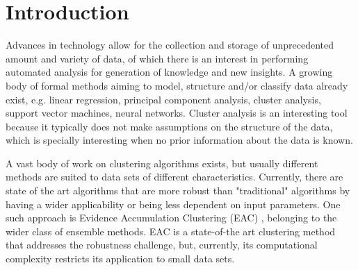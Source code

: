 
\section{Introduction}
\label{sec:intro}



Advances in technology allow for the collection and storage of unprecedented amount and variety of data, of which there is an interest in performing automated analysis for generation of knowledge and new insights.
A growing body of formal methods aiming to model, structure and/or classify data already exist, e.g. linear regression, principal component analysis, cluster analysis, support vector machines, neural networks.
Cluster analysis is an interesting tool because it typically does not make assumptions on the structure of the data, which is specially interesting when no prior information about the data is known.

A vast body of work on clustering algorithms exists, but usually different methods are suited to data sets of different characteristics.
Currently, there are state of the art algorithms that are more robust than "traditional" algorithms by having a wider applicability or being less dependent on input parameters.
One such approach is Evidence Accumulation Clustering (EAC) \cite{Fred2005}, belonging to the wider class of ensemble methods.
EAC is a state-of-the art clustering method that addresses the robustness challenge, but, currently, its computational complexity restricts its application to small data sets.

